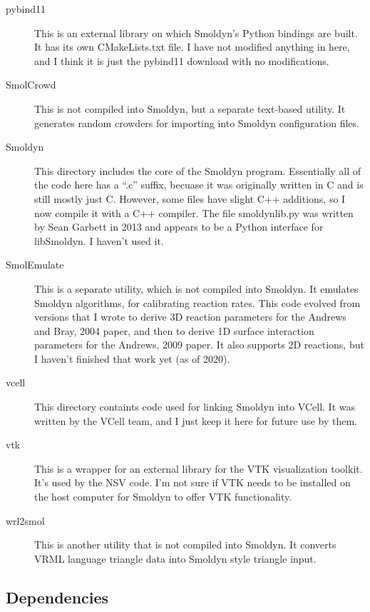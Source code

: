 \documentclass {book}
\begin{document}
\begin{description}
\item[pybind11] This is an external library on which Smoldyn's Python bindings are built. It has its own CMakeLists.txt file. I have not modified anything in here, and I think it is just the pybind11 download with no modifications.

\item[SmolCrowd] This is not compiled into Smoldyn, but a separate text-based utility. It generates random crowders for importing into Smoldyn configuration files.

\item[Smoldyn] This directory includes the core of the Smoldyn program. Essentially all of the code here has a ``.c'' suffix, becuase it was originally written in C and is still mostly just C. However, some files have slight C++ additions, so I now compile it with a C++ compiler. The file smoldynlib.py was written by Sean Garbett in 2013 and appears to be a Python interface for libSmoldyn. I haven't used it.

\item[SmolEmulate] This is a separate utility, which is not compiled into Smoldyn. It emulates Smoldyn algorithms, for calibrating reaction rates. This code evolved from versions that I wrote to derive 3D reaction parameters for the Andrews and Bray, 2004 paper, and then to derive 1D surface interaction parameters for the Andrews, 2009 paper. It also supports 2D reactions, but I haven't finished that work yet (as of 2020).

\item[vcell] This directory containts code used for linking Smoldyn into VCell. It was written by the VCell team, and I just keep it here for future use by them.

\item[vtk] This is a wrapper for an external library for the VTK visualization toolkit. It's used by the NSV code. I'm not sure if VTK needs to be installed on the host computer for Smoldyn to offer VTK functionality.

\item[wrl2smol] This is another utility that is not compiled into Smoldyn. It converts VRML language triangle data into Smoldyn style triangle input.

\end{description}


\subsection{Dependencies}
\end{document}
